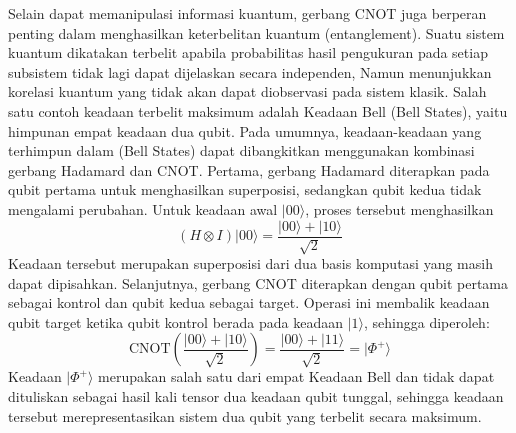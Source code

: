 Selain dapat memanipulasi informasi kuantum, gerbang CNOT juga berperan penting dalam menghasilkan keterbelitan kuantum (entanglement). Suatu sistem kuantum dikatakan terbelit apabila probabilitas hasil pengukuran pada setiap subsistem tidak lagi dapat dijelaskan secara independen, Namun menunjukkan korelasi kuantum yang tidak akan dapat diobservasi pada sistem klasik. Salah satu contoh keadaan terbelit maksimum adalah Keadaan Bell (Bell States), yaitu himpunan empat keadaan dua qubit. Pada umumnya, keadaan-keadaan yang terhimpun dalam (Bell States) dapat dibangkitkan menggunakan kombinasi gerbang Hadamard dan CNOT. Pertama, gerbang Hadamard diterapkan pada qubit pertama untuk menghasilkan superposisi, sedangkan qubit kedua tidak mengalami perubahan. Untuk keadaan awal $|00\rangle$, proses tersebut menghasilkan
\begin{equation}
    \label{eq:bell_state}
    (H \otimes I) |00\rangle = \frac{|00\rangle + |10\rangle}{\sqrt{2}}
\end{equation}
Keadaan tersebut merupakan superposisi dari dua basis komputasi yang masih dapat dipisahkan. Selanjutnya, gerbang CNOT diterapkan dengan qubit pertama sebagai kontrol dan qubit kedua sebagai target. Operasi ini membalik keadaan qubit target ketika qubit kontrol berada pada keadaan $|1\rangle$, sehingga diperoleh:
\begin{equation}
    \label{eq:bell_state_2}
    \text{CNOT} \left( \frac{|00\rangle + |10\rangle}{\sqrt{2}} \right) = \frac{|00\rangle + |11\rangle}{\sqrt{2}} = |\Phi^+\rangle
\end{equation}
Keadaan $|\Phi^+\rangle$ merupakan salah satu dari empat Keadaan Bell dan tidak dapat dituliskan sebagai hasil kali tensor dua keadaan qubit tunggal, sehingga keadaan tersebut merepresentasikan sistem dua qubit yang terbelit secara maksimum.

